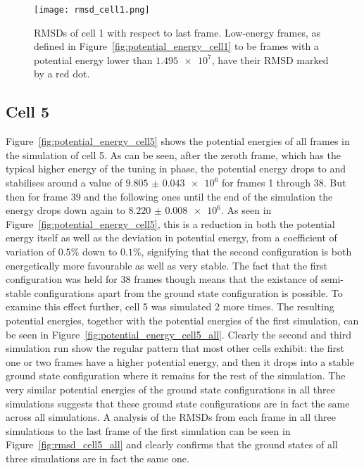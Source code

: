 \begin{figure}[ht]
\centering
  \texttt{[image: rmsd\_cell1.png]}
  \caption{RMSDs of cell 1 with respect to last frame. Low-energy frames, as defined in Figure~\ref{fig:potential_energy_cell1} to be frames with a potential energy lower than \(\num{1.495e7}\), have their RMSD marked by a red dot.}
  \label{fig:rmsd_cell1}
\end{figure}


\FloatBarrier

\subsection{Cell 5} %
\label{sub:cell_5}

Figure~\ref{fig:potential_energy_cell5} shows the potential energies of all frames in the simulation of cell 5. As can be seen, after the zeroth frame, which has the typical higher energy of the tuning in phase, the potential energy drops to and stabilises around a value of \(\num{9.805(43)e6}\) for frames 1 through 38. But then for frame 39 and the following ones until the end of the simulation the energy drops down again to \(\num{8.220(8)e6}\). As seen in Figure~\ref{fig:potential_energy_cell5}, this is a reduction in both the potential energy itself as well as the deviation in potential energy, from a coefficient of variation of \(0.5 \%\) down to \(0.1 \%\), signifying that the second configuration is both energetically more favourable as well as very stable. The fact that the first configuration was held for 38 frames though means that the existance of semi-stable configurations apart from the ground state configuration is possible. To examine this effect further, cell 5 was simulated 2 more times. The resulting potential energies, together with the potential energies of the first simulation, can be seen in Figure~\ref{fig:potential_energy_cell5_all}. Clearly the second and third simulation run show the regular pattern that most other cells exhibit: the first one or two frames have a higher potential energy, and then it drops into a stable ground state configuration where it remains for the rest of the simulation. The very similar potential energies of the ground state configurations in all three simulations suggests that these ground state configurations are in fact the same across all simulations. A analysis of the RMSDs from each frame in all three simulations to the last frame of the first simulation can be seen in Figure~\ref{fig:rmsd_cell5_all} and clearly confirms that the ground states of all three simulations are in fact the same one.


